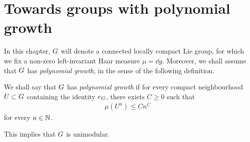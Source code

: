 \chapter{Towards groups with polynomial growth}

In this chapter,
$G$ will denote a connected locally compact Lie group,
for which we fix a non-zero left-invariant Haar measure $\mu = \dd g$.
Moreover,
we shall assume that $G$ has \emph{polynomial growth},
in the sense of the following definition.

\begin{definition}
    We shall say that $G$ has \emph{polynomial growth}
    if for every compact neighbourhood $U \subset G$
    containing the identity $e_G$,
    there exists $C \geq 0$ such that
    \begin{align*}
        \mu(U^n) \leq C n^C
    \end{align*}
    for every $n \in \mathbb{N}$.
\end{definition}

This implies that $G$ is unimodular.
